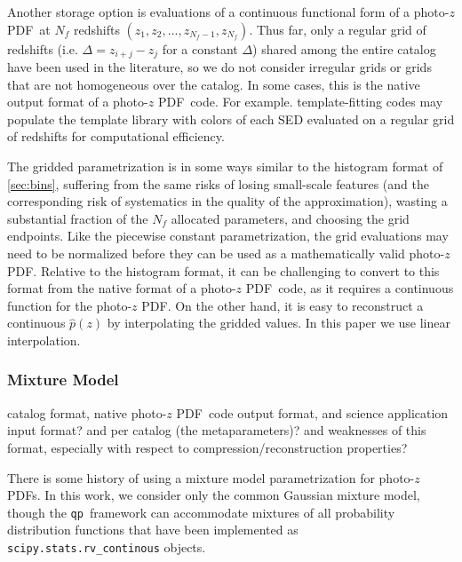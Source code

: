 \documentclass[\docopts]{\docclass}
\newcommand{\qp}{\texttt{qp}}
\newcommand{\pz}{photo-$z$ PDF}
\begin{document}
Another storage option is evaluations of a continuous functional form of a \pz\ 
at $N_{f}$ redshifts $(z_{1}, z_{2}, \dots, z_{N_{f}-1}, z_{N_{f}})$.  Thus 
far, only a regular grid of redshifts (i.e. $\Delta=z_{i+j}-z_{j}$ for a 
constant $\Delta$) shared among the entire catalog have been used in the 
literature, so we do not consider irregular grids or grids that are not 
homogeneous over the catalog.   In some cases, this is the native output format 
of a \pz\ code.  For example. template-fitting codes may populate the template 
library with colors of each SED evaluated on a regular grid of redshifts for 
computational efficiency.



The gridded parametrization is in some ways similar to the histogram format of 
\ref{sec:bins}, suffering from the same risks of losing small-scale features 
(and the corresponding risk of systematics in the quality of the 
approximation), wasting a substantial fraction of the $N_{f}$ allocated 
parameters, and choosing the grid endpoints.  Like the piecewise constant 
parametrization, the grid evaluations may need to be normalized before they can 
be used as a mathematically valid \pz.  Relative to the histogram format, it 
can be challenging to convert to this format from the native format of a \pz\ 
code, as it requires a continuous function for the \pz.  On the other hand, it 
is easy to reconstruct a continuous $\hat{p}(z)$ by interpolating the gridded 
values.  In this paper we use linear interpolation.  \COMMENT{Expand on this.}

\subsubsection{Mixture Model}
\label{sec:mm}


catalog format, native \pz\ code output format, and science application input 
format?
and per catalog (the metaparameters)?
and weaknesses of this format, especially with respect to 
compression/reconstruction properties?

There is some history of using a mixture model parametrization for \pz s.  
  In this work, we consider only the common Gaussian 
mixture model, though the \qp\ framework can accommodate mixtures of all 
probability distribution functions that have been implemented as 
\texttt{scipy.stats.rv\_continous} objects.
\end{document}
